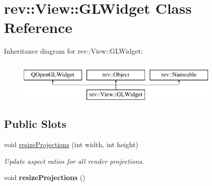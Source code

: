 \hypertarget{classrev_1_1_view_1_1_g_l_widget}{}\section{rev\+::View\+::G\+L\+Widget Class Reference}
\label{classrev_1_1_view_1_1_g_l_widget}
Inheritance diagram for rev\+::View\+::G\+L\+Widget\+:\begin{figure}[H]
\begin{center}
\leavevmode
\includegraphics[height=2.000000cm]{classrev_1_1_view_1_1_g_l_widget}
\end{center}
\end{figure}
\subsection*{Public Slots}
\begin{DoxyCompactItemize}
\item 
\mbox{\label{classrev_1_1_view_1_1_g_l_widget_af2b8ce16797d7f7db60d308a301475be}} 
void \mbox{\hyperlink{classrev_1_1_view_1_1_g_l_widget_af2b8ce16797d7f7db60d308a301475be}{resize\+Projections}} (int width, int height)
\begin{DoxyCompactList}\small\item\em Update aspect ratios for all render projections. \end{DoxyCompactList}\item 
\mbox{\label{classrev_1_1_view_1_1_g_l_widget_ad03a5e3254e0310ac8bd8a4911624108}} 
void {\bfseries resize\+Projections} ()
\end{DoxyCompactItemize}
